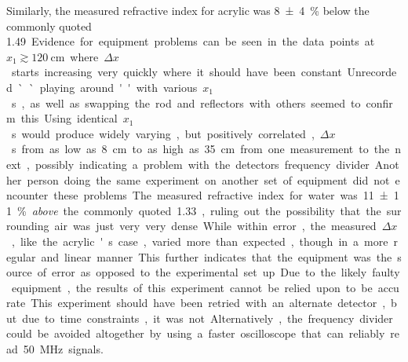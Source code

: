 \documentclass[a4paper]{scrartcl}
\begin{document}
Similarly, the measured refractive index for acrylic was \SI{8 \pm 4}{\percent} below the commonly quoted \SI{1.49}. Evidence for equipment problems can be seen in the data points at \(x_1 \gtrsim \SI{120}{\centi\metre}\) where \(\Delta x\) starts increasing very quickly where it should have been constant.

Unrecorded ``playing around'' with various \(x_1\)s, as well as swapping the rod and reflectors with others seemed to confirm this. Using identical \(x_1\)s would produce widely varying, but positively correlated, \(\Delta x\)s from as low as \SI{8}{\centi\metre} to as high as \SI{35}{\centi\metre} from one measurement to the next, possibly indicating a problem with the detectors frequency divider. Another person doing the same experiment on another set of equipment did not encounter these problems.

The measured refractive index for water was \SI{11 \pm 11}{\percent} \emph{above} the commonly quoted \SI{1.33}{}, ruling out the possibility that the surrounding air was just very very dense. While within error, the measured \(\Delta x\), like the acrylic's case, varied more than expected, though in a more regular and linear manner. This further indicates that the equipment was the source of error as opposed to the experimental set up.

Due to the likely faulty equipment, the results of this experiment cannot be relied upon to be accurate. This experiment should have been retried with an alternate detector, but due to time constraints, it was not. Alternatively, the frequency divider could be avoided altogether by using a faster oscilloscope that can reliably read \SI{50}{\mega\hertz} signals.
\end{document}
